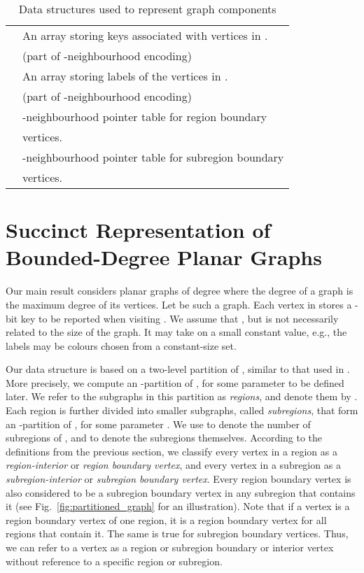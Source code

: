 \begin{table}[H]
\begin{tabular}{ l | l}
			 & An array storing keys associated with vertices in   . \\
			 & (part of -neighbourhood encoding) \\		
			 & An array storing labels of the vertices in . \\
			& (part of -neighbourhood encoding) \\ 
			 & -neighbourhood pointer table for region boundary \\
			& vertices. \\
			 & -neighbourhood pointer table for subregion boundary\\
			& vertices. \\ \hline
		\end{tabular}
	\caption{Data structures used to represent graph components}
	\label{tab:data_structs}
\end{table}

\section{Succinct Representation of Bounded-Degree Planar Graphs}
\label{sec:graph_rep}


Our main result considers planar graphs of degree 
where the degree of a graph is the maximum degree of its vertices.
Let  be such a graph.
Each vertex  in  stores a -bit key
to be reported when visiting .
We assume that , but
 is not necessarily related to the size of the graph.
It may take on a small constant value, e.g., the labels may be colours
chosen from a constant-size set.

Our data structure is based on a two-level partition of , similar to
that used in \cite{DBLP:journals/talg/BoseCHMM12}.
More precisely, we compute an
-partition of , for some parameter  to be
defined later.
We refer to the subgraphs in this partition as \emph{regions}, and
denote them by .
Each region  is further
divided into smaller subgraphs, called \emph{subregions}, that form
an -partition of , for some parameter
.
We use  to denote the number of subregions of , and  to denote the subregions themselves.
According to the definitions from the previous section, we classify
every vertex in a region  as a \emph{region-interior} or
\emph{region boundary vertex}, and every vertex in a subregion
 as a \emph{subregion-interior} or \emph{subregion boundary
  vertex}.
Every region boundary vertex is also considered to be a
subregion boundary vertex in any subregion that contains it
(see Fig.~\ref{fig:partitioned_graph} for an illustration).
Note that if a vertex is a region boundary vertex of one region, it is a region
boundary vertex for all regions that contain it.
The same is true for subregion boundary vertices.
Thus, we can refer to a vertex as a region or subregion boundary or interior
vertex without reference to a specific region or subregion.

